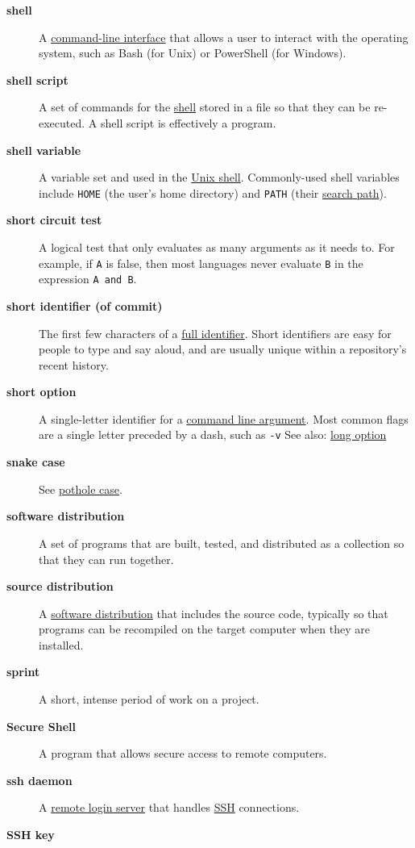 \documentclass[
]{krantz}
\begin{document}
\begin{description}
\item[\textbf{shell}]
A \protect\hyperlink{cli}{command-line interface} that allows a user to interact with the operating system, such as Bash (for Unix) or PowerShell (for Windows).
\item[\textbf{shell script}]
A set of commands for the \protect\hyperlink{shell}{shell} stored in a file so that they can be re-executed. A shell script is effectively a program.
\item[\textbf{shell variable}]
A variable set and used in the \protect\hyperlink{shell}{Unix shell}. Commonly-used shell variables include \texttt{HOME} (the user's home directory) and \texttt{PATH} (their \protect\hyperlink{search_path}{search path}).
\item[\textbf{short circuit test}]
A logical test that only evaluates as many arguments as it needs to. For example, if \texttt{A} is false, then most languages never evaluate \texttt{B} in the expression \texttt{A\ and\ B}.
\item[\textbf{short identifier (of commit)}]
The first few characters of a \protect\hyperlink{full_identifier_git}{full identifier}. Short identifiers are easy for people to type and say aloud, and are usually unique within a repository's recent history.
\item[\textbf{short option}]
A single-letter identifier for a \protect\hyperlink{command_line_argument}{command line argument}. Most common flags are a single letter preceded by a dash, such as \texttt{-v} See also: \protect\hyperlink{long_option}{long option}
\item[\textbf{snake case}]
See \protect\hyperlink{pothole_case}{pothole case}.
\item[\textbf{software distribution}]
A set of programs that are built, tested, and distributed as a collection so that they can run together.
\item[\textbf{source distribution}]
A \protect\hyperlink{software_distribution}{software distribution} that includes the source code, typically so that programs can be recompiled on the target computer when they are installed.
\item[\textbf{sprint}]
A short, intense period of work on a project.
\item[\textbf{Secure Shell}]
A program that allows secure access to remote computers.
\item[\textbf{ssh daemon}]
A \protect\hyperlink{remote_login_server}{remote login server} that handles \protect\hyperlink{ssh}{SSH} connections.
\item[\textbf{SSH key}]

\end{description}
\end{document}
